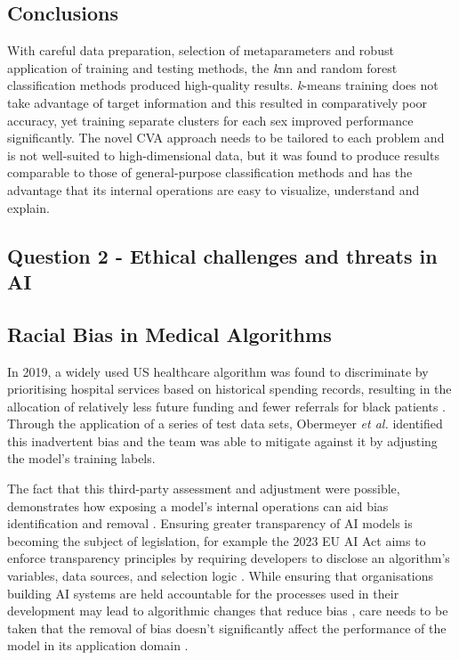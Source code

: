 \documentclass[a4paper, 11pt]{article}
\begin{document}
\vspace{\baselineskip}

\subsection*{Conclusions}

With careful data preparation, selection of metaparameters and robust application of training and testing methods, 
the \textit{k}nn and random forest classification methods produced high-quality results. 
\textit{k}-means training does not take advantage of target information and this resulted in comparatively poor accuracy, yet training
separate clusters for each sex improved performance significantly.
The novel CVA approach needs to be tailored to each problem and is not well-suited to high-dimensional data, but it was found to produce results comparable to those of general-purpose classification methods and has the advantage that 
its internal operations are easy to visualize, understand and explain.

\begin{center}
\subsection*{Question 2 - Ethical challenges and threats in AI}
\end{center}

\subsection*{Racial Bias in Medical Algorithms}

In 2019, a widely used US healthcare algorithm was found to discriminate by prioritising hospital services 
based on historical spending records, resulting in the allocation of relatively less future funding and fewer referrals 
for black patients \cite{Jemielity2019, Ledford2019}. 
Through the application of a series of test data sets, Obermeyer \textit{et al.} \cite{Obermeyer2019} identified this inadvertent bias 
and the team was able to mitigate against it by adjusting the model’s training labels. 

The fact that this third-party assessment and adjustment were possible, demonstrates how exposing a model’s internal operations 
can aid bias identification and removal \cite{Seroussi2020, Winter2023}. 
Ensuring greater transparency of AI models is becoming the subject of legislation, 
for example the 2023 EU AI Act aims to enforce transparency principles by requiring developers to disclose an 
algorithm’s variables, data sources, and selection logic \cite{EuropeanParliament2023, Edwards2021}. 
While ensuring that organisations building AI systems are held accountable for the processes used in their development 
may lead to algorithmic changes that reduce bias \cite{Donovan2018, Lawry2020}, 
care needs to be taken that the removal of bias doesn't significantly affect the performance of the model 
in its application domain \cite{Kearns2020}.
\end{document}
